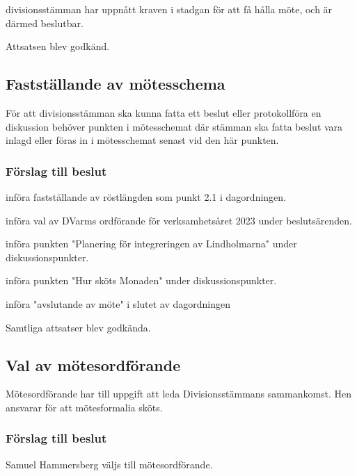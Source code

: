 \documentclass[protokoll]{dvd}
\begin{document}
\begin{attsatser}
    \item divisionsstämman har uppnått kraven i stadgan för att få hålla möte, och är därmed beslutbar.
\end{attsatser}

Attsatsen blev godkänd.

\subsection{Fastställande av mötesschema}

För att divisionsstämman ska kunna fatta ett beslut eller protokollföra en diskussion behöver punkten i mötesschemat där stämman ska fatta beslut vara inlagd eller föras in i mötesschemat senast vid den här punkten.

\subsubsection*{Förslag till beslut}

\begin{attsatser}
    \item införa fastställande av röstlängden som punkt 2.1 i dagordningen.
    \item införa val av DVarms ordförande för verksamhetsåret 2023 under beslutsärenden.
    \item införa punkten "Planering för integreringen av Lindholmarna" under diskussionspunkter.
    \item införa punkten "Hur sköts Monaden" under diskussionspunkter.
    \item införa "avslutande av möte" i slutet av dagordningen
\end{attsatser}

Samtliga attsatser blev godkända.

\subsection{Val av mötesordförande}

Mötesordförande har till uppgift att leda Divisionsstämmans sammankomst.
Hen ansvarar för att mötesformalia sköts.

\subsubsection*{Förslag till beslut}

\begin{attsatser}
    \item Samuel Hammersberg väljs till mötesordförande.
\end{attsatser}
\end{document}

